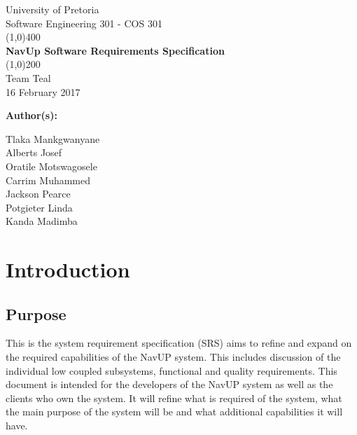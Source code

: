 \documentclass[12pt, a4paper]{article}
\begin{document}
\begin{titlepage}
	\begin{center}
	\huge{University of Pretoria\\
	Software Engineering 301 - COS 301}\\
	\line(1,0){400}\\
	\huge{\bfseries NavUp Software Requirements Specification}\\
	\line(1,0){200}\\
	Team Teal\\
	16 February 2017\\
	[3cm]
	\end{center}
	\begin{flushleft}
	\bfseries{Author(s):}
	\end{flushleft}
	\begin{flushleft}
	Tlaka Mankgwanyane	\\
	Alberts Josef			\\
	Oratile Motswagosele	\\
	Carrim Muhammed		\\
	Jackson Pearce			\\
	Potgieter Linda		\\
	Kanda Madimba			\\
	\end{flushleft}
\end{titlepage}

\tableofcontents

\section{Introduction}
\subsection{Purpose} 
This is the system requirement specification (SRS) aims to refine and expand on the required capabilities of the NavUP system. This includes discussion of the individual low coupled subsystems, functional and quality requirements. This document is intended for the developers of the NavUP system as well as the clients who own the system. It will refine what is required of the system, what the main purpose of the system will be and what additional capabilities it will have. 
\end{document}
